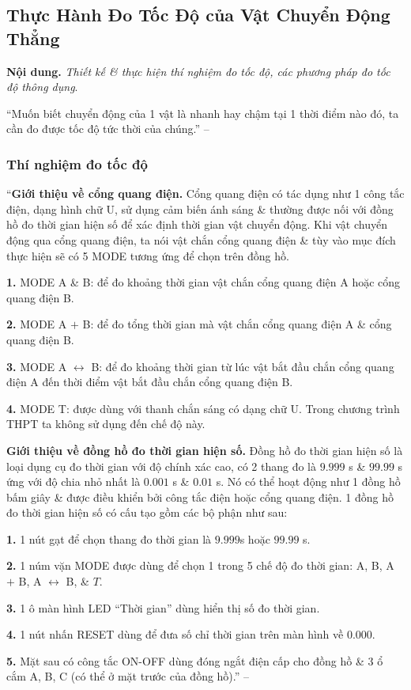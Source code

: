 \documentclass{article}
\numberwithin{equation}{section}
\begin{document}
\subsection{Thực Hành Đo Tốc Độ của Vật Chuyển Động Thẳng}
\textbf{Nội dung.} \textit{Thiết kế \& thực hiện thí nghiệm đo tốc độ, các phương pháp đo tốc độ thông dụng}.

``Muốn biết chuyển động của 1 vật là nhanh hay chậm tại 1 thời điểm nào đó, ta cần đo được tốc độ tức thời của chúng.'' -- \cite[p. 36]{SGK_Vat_Ly_10_Chan_Troi_Sang_Tao}

\subsubsection{Thí nghiệm đo tốc độ}
``\textbf{Giới thiệu về cổng quang điện.} Cổng quang điện có tác dụng như 1 công tắc điện, dạng hình chữ U, sử dụng cảm biến ánh sáng \& thường được nối với đồng hồ đo thời gian hiện số để xác định thời gian vật chuyển động. Khi vật chuyển động qua cổng quang điện, ta nói vật chắn cổng quang điện \& tùy vào mục đích thực hiện sẽ có 5 MODE tương ứng để chọn trên đồng hồ.
\begin{enumerate*}
	\item[\textbf{1.}] MODE A \& B: để đo khoảng thời gian vật chắn cổng quang điện A hoặc cổng quang điện B.
	\item[\textbf{2.}] MODE A $+$ B: để đo tổng thời gian mà vật chắn cổng quang điện A \& cổng quang điện B.
	\item[\textbf{3.}] MODE A $\leftrightarrow$ B: để đo khoảng thời gian từ lúc vật bắt đầu chắn cổng quang điện A đến thời điểm vật bắt đầu chắn cổng quang điện B.
	\item[\textbf{4.}] MODE T: được dùng với thanh chắn sáng có dạng chữ U. Trong chương trình THPT ta không sử dụng đến chế độ này.
\end{enumerate*}

\noindent\textbf{Giới thiệu về đồng hồ đo thời gian hiện số.} Đồng hồ đo thời gian hiện số là loại dụng cụ đo thời gian với độ chính xác cao, có 2 thang đo là $9.999$ s \& $99.99$ s ứng với độ chia nhỏ nhất là $0.001$ s \& $0.01$ s. Nó có thể hoạt động như 1 đồng hồ bấm giây \& được điều khiển bởi công tắc điện hoặc cổng quang điện. 1 đồng hồ đo thời gian hiện số có cấu tạo gồm các bộ phận như sau:
\begin{enumerate*}
	\item[\textbf{1.}] 1 nút gạt để chọn thang đo thời gian là $9.999$s hoặc $99.99$ s.
	\item[\textbf{2.}] 1 núm vặn MODE được dùng để chọn 1 trong 5 chế độ đo thời gian: A, B, A $+$ B, A $\leftrightarrow$ B, \& $T$.
	\item[\textbf{3.}] 1 ô màn hình LED ``Thời gian'' dùng hiển thị số đo thời gian.
	\item[\textbf{4.}] 1 nút nhấn RESET dùng để đưa số chỉ thời gian trên màn hình về $0.000$.
	\item[\textbf{5.}] Mặt sau có công tắc ON-OFF dùng đóng ngắt điện cấp cho đồng hồ \& 3 ổ cắm A, B, C (có thể ở mặt trước của đồng hồ).'' -- \cite[p. 38]{SGK_Vat_Ly_10_Chan_Troi_Sang_Tao}
\end{enumerate*}
\end{document}
